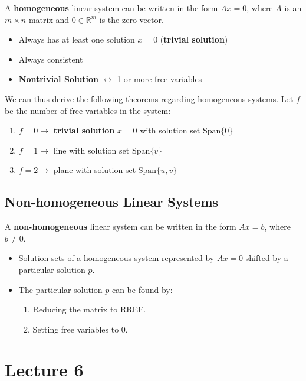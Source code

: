 \documentclass[12pt, letterpaper]{article}
\begin{document}
A \textbf{homogeneous} linear system can be written in the form $ Ax
= 0 $, where $ A $ is an $ m \times n $ matrix and $ 0 \in
\mathbb{R}^m $ is the zero vector.

\begin{itemize}
  \item Always has at least one solution $ x = 0 $ (\textbf{trivial solution})
  \item Always consistent
  \item \textbf{Nontrivial Solution} $ \leftrightarrow $ 1 or more
    free variables
\end{itemize}

We can thus derive the following theorems regarding homogeneous
systems. Let $ f $ be the number of free variables in the system:

\begin{enumerate}
  \item $ f = 0 \rightarrow $ \textbf{trivial solution} $ x = 0 $
    with solution set $ \textrm{Span} \{ 0 \} $
  \item $ f = 1 \rightarrow $ line with solution set $ \textrm{Span} \{ v \} $
  \item $ f = 2 \rightarrow $ plane with solution set $ \textrm{Span}
    \{ u, v \} $
\end{enumerate}

\subsection*{Non-homogeneous Linear Systems}

A \textbf{non-homogeneous} linear system can be written in the form $
Ax = b $, where $ b \neq 0 $.

\begin{itemize}
  \item Solution sets of a homogeneous system represented by $ Ax = 0
    $ shifted by a particular solution $ p $.
  \item The particular solution $ p $ can be found by:
    \begin{enumerate}
      \item Reducing the matrix to RREF.
      \item Setting free variables to $ 0 $.
    \end{enumerate}
\end{itemize}

\section*{Lecture 6}
\end{document}
